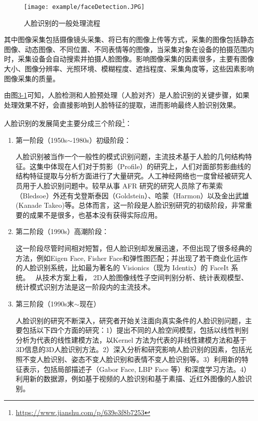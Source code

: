 \begin{figure}[!htp]

\centering
\texttt{[image: example/faceDetection.JPG]}
\caption{人脸识别的一般处理流程}
\label{figure:3-1}

\end{figure}

其中图像采集包括摄像镜头采集、将已有的图像上传等方式，采集的图像包括静态图像、动态图像、不同位置、不同表情等的图像，当采集对象在设备的拍摄范围内时，采集设备会自动搜索并拍摄人脸图像。影响图像采集的因素很多，主要有图像大小、图像分辨率、光照环境、模糊程度、遮挡程度、采集角度等，这些因素影响图像采集的质量。

由图\href{figure:3-1}{3-1}可知，人脸检测和人脸预处理（人脸对齐）是人脸识别的关键步骤，如果处理效果不好，会直接影响到人脸特征的提取，进而影响最终人脸识别效果。

人脸识别的发展简史主要分成三个阶段\footnote{\url{https://www.jianshu.com/p/639e3f8b7253}}：
\begin{enumerate}
    \item 第一阶段（1950s$\sim$1980s）初级阶段：

    人脸识别被当作一个一般性的模式识别问题，主流技术基于人脸的几何结构特征。这集中体现在人们对于剪影（Profile）的研究上，人们对面部剪影曲线的结构特征提取与分析方面进行了大量研究。人工神经网络也一度曾经被研究人员用于人脸识别问题中。较早从事 AFR 研究的研究人员除了布莱索（Bledsoe）外还有戈登斯泰因（Goldstein）、哈蒙（Harmon）以及金出武雄(Kanade Takeo)等。总体而言，这一阶段是人脸识别研究的初级阶段，非常重要的成果不是很多，也基本没有获得实际应用。

    \item 第二阶段（1990s）高潮阶段：

    这一阶段尽管时间相对短暂，但人脸识别却发展迅速，不但出现了很多经典的方法，例如Eigen Face, Fisher Face和弹性图匹配；并出现了若干商业化运作的人脸识别系统，比如最为著名的 Visionics（现为 Identix）的 FaceIt 系统。  从技术方案上看， 2D人脸图像线性子空间判别分析、统计表观模型、统计模式识别方法是这一阶段内的主流技术。

    \item 第三阶段（1990s末$\sim$现在）

    人脸识别的研究不断深入，研究者开始关注面向真实条件的人脸识别问题，主要包括以下四个方面的研究：1）提出不同的人脸空间模型，包括以线性判别分析为代表的线性建模方法，以Kernel 方法为代表的非线性建模方法和基于3D信息的3D人脸识别方法。2）深入分析和研究影响人脸识别的因素，包括光照不变人脸识别、姿态不变人脸识别和表情不变人脸识别等。3）利用新的特征表示，包括局部描述子（Gabor Face, LBP Face 等）和深度学习方法。4）利用新的数据源，例如基于视频的人脸识别和基于素描、近红外图像的人脸识别。
\end{enumerate}

